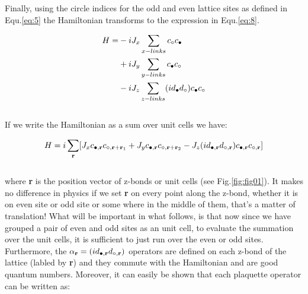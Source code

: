 \documentclass{article}
\begin{document}
\noindent Finally, using the circle indices for the odd and even lattice sites as defined in Equ.\hspace{0.2mm}\ref{eq:5} the Hamiltonian transforms to the expression in Equ.\hspace{0.2mm}\ref{eq:8}.

\begin{equation}\label{eq:8}
	\begin{aligned}
		H= &-iJ_x \sum_{x-links} c_{\circ}c_{\color{black}\bullet}\\
		&+iJ_y \sum_{y-links} c_{\color{black}\bullet}c_{\circ}\\
		&-iJ_z \sum_{z-links} (id_{\color{black}\bullet}d_{\circ})c_{\color{black}\bullet}c_{\circ}\\ 
	\end{aligned}
\end{equation}\\

\noindent If we write the Hamiltonian as a sum over unit cells we have:

\begin{equation}\label{eq:9}
	\begin{aligned}
		H= i\sum_{\textbf{r}}[J_x c_{\color{black}\bullet,\textbf{r}}c_{\circ,\textbf{r}+\textbf{r}_1} + J_y c_{\color{black}\bullet,\textbf{r}}c_{\circ,\textbf{r}+\textbf{r}_2} - J_z (id_{\color{black}\bullet,\textbf{r}}d_{\circ,\textbf{r}})c_{\color{black}\bullet,\textbf{r}}c_{\circ,\textbf{r}}]\\ 
	\end{aligned}
\end{equation}\\

\noindent where \textbf{r} is the position vector of z-bonds or unit cells  (see Fig.\hspace{0.2mm}\ref{fig:fig01}). It makes no difference in physics if we set \textbf{r} on every point along the z-bond, whether it is on even site or odd site or some where in the middle of them, that's a matter of translation! 
What will be important in what follows, is that now since we have grouped a pair of even and odd sites as an unit cell, to evaluate the summation over the unit cells, it is sufficient to just run over the even or odd sites.\\
Furthermore, the $\alpha_\textbf{r} = (id_{\color{black}\bullet,\textbf{r}}d_{\circ,\textbf{r}})$ operators are defined on each z-bond of the lattice (labled by \textbf{r}) and they commute with the Hamiltonian and are good quantum numbers.
Moreover, it can easily be shown that each plaquette operator can be written as:
\end{document}
